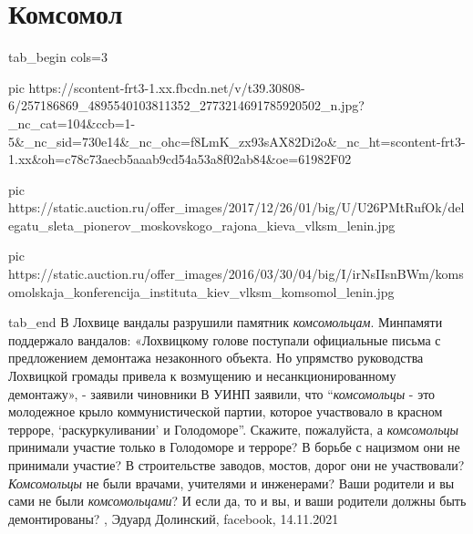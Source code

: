  
 
 
 
 
\chapter{Комсомол}
\label{sec:slova.komsomol}


\ifcmt
  tab_begin cols=3

    pic https://scontent-frt3-1.xx.fbcdn.net/v/t39.30808-6/257186869_4895540103811352_2773214691785920502_n.jpg?_nc_cat=104&ccb=1-5&_nc_sid=730e14&_nc_ohc=f8LmK_zx93sAX82Di2o&_nc_ht=scontent-frt3-1.xx&oh=c78c73aecb5aaab9cd54a53a8f02ab84&oe=61982F02

		pic https://static.auction.ru/offer_images/2017/12/26/01/big/U/U26PMtRufOk/delegatu_sleta_pionerov_moskovskogo_rajona_kieva_vlksm_lenin.jpg

		pic https://static.auction.ru/offer_images/2016/03/30/04/big/I/irNsIIsnBWm/komsomolskaja_konferencija_instituta_kiev_vlksm_komsomol_lenin.jpg

  tab_end
\fi
В Лохвице вандалы разрушили памятник \emph{комсомольцам}. Минпамяти поддержало
вандалов: «Лохвицкому голове поступали официальные письма с предложением
демонтажа незаконного объекта. Но упрямство руководства Лохвицкой громады
привела к возмущению и несанкционированному демонтажу», - заявили чиновники В
УИНП заявили, что \enquote{\emph{комсомольцы} - это молодежное крыло коммунистической
партии, которое участвовало в красном терроре, \enquote{раскуркуливании} и
Голодоморе}.  Скажите, пожалуйста, а \emph{комсомольцы} принимали участие только в
Голодоморе и терроре?  В борьбе с нацизмом они не принимали участие? В
строительстве заводов, мостов, дорог они не участвовали? \emph{Комсомольцы} не были
врачами, учителями и инженерами?  Ваши родители и вы сами не были
\emph{комсомольцами}? И если да, то и вы, и ваши родители должны быть демонтированы?
, Эдуард Долинский, 
facebook, 14.11.2021
